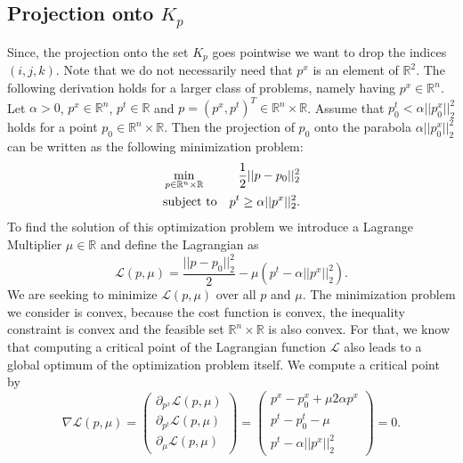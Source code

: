 \documentclass{scrreprt}
\begin{document}

        \subsection{Projection onto $K_{p}$}

            Since, the projection onto the set $K_{p}$ goes pointwise we want to drop the indices $(i, j, k)$. Note that we do not necessarily need that $p^{x}$ is an element of $\mathbb{R}^{2}$. The following derivation holds for a larger class of problems, namely having $p^{x} \in \mathbb{R}^{n}$. Let $\alpha > 0$, $p^{x} \in \mathbb{R}^{n}$, $p^{t} \in \mathbb{R}$ and $p = (p^{x}, p^{t})^{T} \in \mathbb{R}^{n} \times \mathbb{R}$. Assume that $p_{0}^{t} < \alpha ||p_{0}^{x}||_{2}^{2}$ holds for a point $p_{0} \in \mathbb{R}^{n}\times\mathbb{R}$. Then the projection of $p_{0}$ onto the parabola $\alpha ||p_{0}^{x}||_{2}^{2}$ can be written as the following minimization problem:
                \begin{eqnarray}
                    &\min\limits_{p \in \mathbb{R}^{n} \times \mathbb{R}}& \frac{1}{2} ||p - p_{0}||_{2}^{2} \notag \\
                    &\textnormal{subject to}& p^{t} \ge \alpha||p^{x}||_{2}^{2}. \notag
                \end{eqnarray}
            To find the solution of this optimization problem we introduce a Lagrange Multiplier $\mu \in \mathbb{R}$ and define the Lagrangian as
                $$
                    \mathcal{L}(p, \mu) = \frac{||p - p_{0}||_{2}^{2}}{2} - \mu \left( p^{t} - \alpha||p^{x}||_{2}^{2} \right).
                $$
            We are seeking to minimize $\mathcal{L}(p, \mu)$ over all $p$ and $\mu$. The minimization problem we consider is convex, because the cost function is convex, the inequality constraint is convex and the feasible set $\mathbb{R}^{n} \times \mathbb{R}$ is also convex. For that, we know that computing a critical point of the Lagrangian function $\mathcal{L}$ also leads to a global optimum of the optimization problem itself. We compute a critical point by
                \begin{equation}
                    \nabla \mathcal{L}(p, \mu) =
                    \begin{pmatrix}
                        \partial_{p^{x}} \mathcal{L}(p, \mu) \\
                        \partial_{p^{t}} \mathcal{L}(p, \mu) \\
                        \partial_{\mu} \mathcal{L}(p, \mu)
                    \end{pmatrix} = 
                    \begin{pmatrix}
                        p^{x} - p_{0}^{x} + \mu 2 \alpha p^{x} \\
                        p^{t} - p_{0}^{t} - \mu \\
                        p^{t} - \alpha||p^{x}||_{2}^{2}
                    \end{pmatrix}
                    = 0. \label{eq:linearSystem}
                \end{equation}
\end{document}
